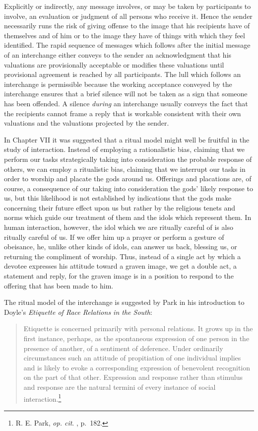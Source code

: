 \documentclass[twoside,symmetric,nobib,justified]{tufte-book}
\begin{document}
Explicitly or indirectly, any message involves, or may be taken by
participants to involve, an evaluation or judgment of all persons who
receive it. Hence the sender necessarily runs the risk of giving offense
to the image that his recipients have of themselves and of him or to the
image they have of things with which they feel identified. The rapid
sequence of messages which follows after the initial message of an
interchange either conveys to the sender an acknowledgment that his
valuations are provisionally acceptable or modifies these valuations
until provisional agreement is reached by all participants. The lull
which follows an interchange is permissible because the working
acceptance conveyed by the interchange ensures that a brief silence will
not be taken as a sign that someone has been offended. A silence
\emph{during} an interchange usually conveys the fact that the
recipients cannot frame a reply that is workable consistent with their
own valuations and the valuations projected by the sender.

\enlargethispage{\baselineskip}

In Chapter VII it was suggested that a ritual model might well be
fruitful in the study of interaction. Instead of employing a
rationalistic bias, claiming that we perform our tasks strategically
taking into consideration the probable response of others, we can employ
a ritualistic bias, claiming that we interrupt our tasks in order to
worship and placate the gods around us. Offerings and placations are, of
course, a consequence of our taking into consideration the gods' likely
response to us, but this likelihood is not established by indications
that the gods make concerning their future effect upon us but rather by
the religious tenets and norms which guide our treatment of them and the
idols which represent them. In human interaction, however, the idol
which we are ritually careful of is also ritually careful of us. If we
offer him up a prayer or perform a gesture of obeisance, he, unlike
other kinds of idols, can answer us back, blessing us, or returning the
compliment of worship. Thus, instead of a single act by which a devotee
expresses his attitude toward a graven image, we get a double act, a
statement and reply, for the graven image is in a position to respond to
the offering that has been made to him.

The ritual model of the interchange is suggested by Park in his
introduction to Doyle's \emph{Etiquette of Race Relations in the South}:

\begin{quote}
Etiquette is concerned primarily with personal relations. It grows up in
the first instance, perhaps, as the spontaneous expression of one person
in the presence of another, of a sentiment of deference. Under
ordinarily circumstances such an attitude of propitiation of one
individual implies and is likely to evoke a corresponding expression of
benevolent recognition on the part of that other. Expression and
response rather than stimulus and response are the natural termini of
every instance of social interaction.\footnote{R. E. Park, \emph{op.
  cit}. , p.~182.}
\end{quote}
\end{document}
